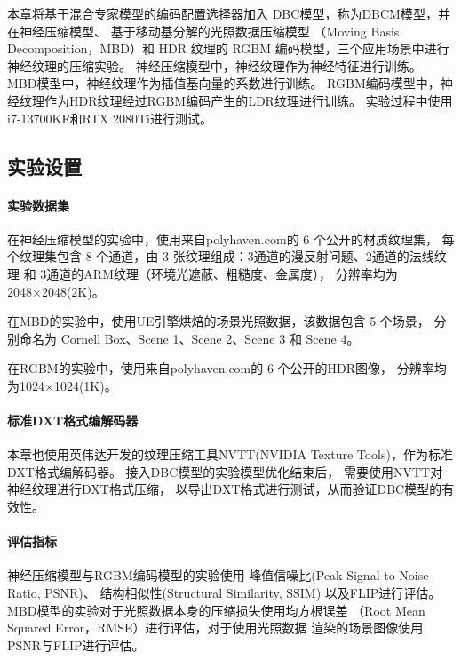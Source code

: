 本章将基于混合专家模型的编码配置选择器加入
DBC模型，称为DBCM模型，并在神经压缩模型、
基于移动基分解的光照数据压缩模型
\cite{silvennoinen2021moving}（Moving Basis Decomposition，MBD）和
HDR 纹理的 RGBM 编码模型，三个应用场景中进行神经纹理的压缩实验。
神经压缩模型中，神经纹理作为神经特征进行训练。
MBD模型中，神经纹理作为插值基向量的系数进行训练。
RGBM编码模型中，神经纹理作为HDR纹理经过RGBM编码产生的LDR纹理进行训练。
实验过程中使用i7-13700KF和RTX 2080Ti进行测试。

\subsection{实验设置}

\paragraph{实验数据集}

在神经压缩模型的实验中，使用来自polyhaven.com\cite{PolyHaven}的 6 个公开的材质纹理集，
每个纹理集包含 8 个通道，由 3 张纹理组成：3通道的漫反射问题、2通道的法线纹理 和 3通道的ARM纹理（环境光遮蔽、粗糙度、金属度），
分辨率均为2048×2048(2K)。

在MBD的实验中，使用UE引擎烘焙的场景光照数据，该数据包含 5 个场景，
分别命名为 Cornell Box、Scene 1、Scene 2、Scene 3 和 Scene 4。

在RGBM的实验中，使用来自polyhaven.com\cite{PolyHaven}的 6 个公开的HDR图像，
分辨率均为1024×1024(1K)。

\paragraph{标准DXT格式编解码器}

本章也使用英伟达开发的纹理压缩工具NVTT(NVIDIA Texture Tools)，作为标准DXT格式编解码器。
接入DBC模型的实验模型优化结束后，
需要使用NVTT对神经纹理进行DXT格式压缩，
以导出DXT格式进行测试，从而验证DBC模型的有效性。

\paragraph{评估指标}

神经压缩模型与RGBM编码模型的实验使用
峰值信噪比(Peak Signal-to-Noise Ratio, PSNR)、
结构相似性\cite{wang2004image}(Structural Similarity, SSIM)
以及FLIP\cite{andersson2020flip}进行评估。
MBD模型的实验对于光照数据本身的压缩损失使用均方根误差
（Root Mean Squared Error，RMSE）进行评估，对于使用光照数据
渲染的场景图像使用PSNR与FLIP进行评估。


